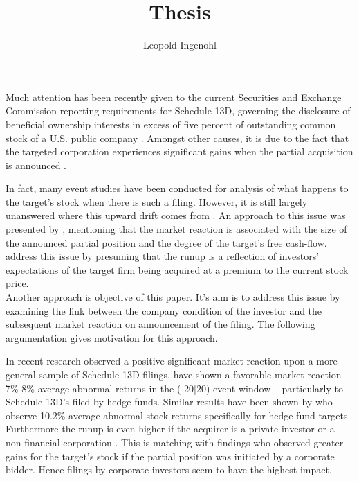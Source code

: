 \documentclass[12pt]{article}
\title{Thesis}
\author{Leopold Ingenohl}
\begin{document}
\maketitle

Much attention has been recently given to the current Securities and Exchange Commission reporting requirements for Schedule 13D, governing the disclosure of beneficial ownership interests in excess of five percent of outstanding common stock of a U.S. public company \citep{Giglia2018}. Amongst other causes, it is due to the fact that the targeted corporation experiences significant gains when the partial acquisition is announced \citep{Akhigbe2007}. %

In fact, many event studies have been conducted for analysis of what happens to the target's stock when there is such a filing. However, it is still largely unanswered where this upward drift comes from \citep{Greenwood2009}. An approach to this issue was presented by \citet{Akhigbe2007}, mentioning that the market reaction is associated with the size of the announced partial position and the degree of the target's free cash-flow.
\citet{Greenwood2009} address this issue by presuming that the runup is a reflection of investors' expectations of the target firm being acquired at a premium to the current stock price.\\ 
Another approach is objective of this paper. It's aim is to address this issue by examining the link between the company condition of the investor and the subsequent market reaction on announcement of the filing.%
The following argumentation gives motivation for this approach.  

In recent research \citet{Collin-Dufresne2015} observed a positive significant market reaction upon a more general sample of Schedule 13D filings. \citet{Brav2008} have shown a favorable market reaction -- 7\%-8\% average abnormal returns in the (-20|20) event window -- particularly to Schedule 13D's filed by hedge funds. Similar results have been shown by \citet{Klein2009} who observe 10.2\% average abnormal stock returns specifically for hedge fund targets. Furthermore the runup is even higher if the acquirer is a private investor or a non-financial corporation \citep{Brigida2012}. This is matching with \citet{Akhigbe2007} findings who observed greater gains for the target's stock if the partial position was initiated by a corporate bidder. Hence filings by corporate investors seem to have the highest impact. 
\end{document}

